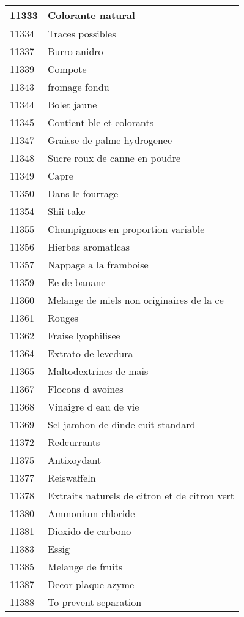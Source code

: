 \begin{longtable}{|l|l|}
11333 & Colorante natural \\ \hline 
11334 & Traces possibles \\ \hline 
11337 & Burro anidro \\ \hline 
11339 & Compote \\ \hline 
11343 & fromage fondu \\ \hline 
11344 & Bolet jaune \\ \hline 
11345 & Contient ble et colorants \\ \hline 
11347 & Graisse de palme hydrogenee \\ \hline 
11348 & Sucre roux de canne en poudre \\ \hline 
11349 & Capre \\ \hline 
11350 & Dans le fourrage \\ \hline 
11354 & Shii take \\ \hline 
11355 & Champignons en proportion variable \\ \hline 
11356 & Hierbas aromatlcas \\ \hline 
11357 & Nappage a la framboise \\ \hline 
11359 & Ee de banane \\ \hline 
11360 & Melange de miels non originaires de la ce \\ \hline 
11361 & Rouges \\ \hline 
11362 & Fraise lyophilisee \\ \hline 
11364 & Extrato de levedura \\ \hline 
11365 & Maltodextrines de mais \\ \hline 
11367 & Flocons d avoines \\ \hline 
11368 & Vinaigre d eau de vie \\ \hline 
11369 & Sel jambon de dinde cuit standard \\ \hline 
11372 & Redcurrants \\ \hline 
11375 & Antixoydant \\ \hline 
11377 & Reiswaffeln \\ \hline 
11378 & Extraits naturels de citron et de citron vert \\ \hline 
11380 & Ammonium chloride \\ \hline 
11381 & Dioxido de carbono \\ \hline 
11383 & Essig \\ \hline 
11385 & Melange de fruits \\ \hline 
11387 & Decor plaque azyme \\ \hline 
11388 & To prevent separation \\ \hline 

\end{longtable}
